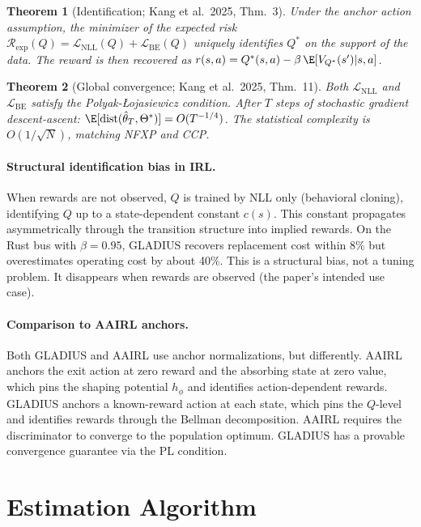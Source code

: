 \documentclass[11pt]{article}
\newtheorem{theorem}{Theorem}
\begin{document}
\begin{theorem}[Identification; Kang et al.\ 2025, Thm.\ 3]
Under the anchor action assumption, the minimizer of the expected risk $\mathcal{R}_{\text{exp}}(Q) = \mathcal{L}_{\text{NLL}}(Q) + \mathcal{L}_{\text{BE}}(Q)$ uniquely identifies $Q^*$ on the support of the data. The reward is then recovered as $r(s,a) = Q^*(s,a) - \beta\,\E[V_{Q^*}(s')|s,a]$.
\end{theorem}

\begin{theorem}[Global convergence; Kang et al.\ 2025, Thm.\ 11]
Both $\mathcal{L}_{\text{NLL}}$ and $\mathcal{L}_{\text{BE}}$ satisfy the Polyak-\L{}ojasiewicz condition. After $T$ steps of stochastic gradient descent-ascent: $\E[\text{dist}(\hat{\theta}_T, \Theta^*)] = O(T^{-1/4})$. The statistical complexity is $O(1/\sqrt{N})$, matching NFXP and CCP.
\end{theorem}

\paragraph{Structural identification bias in IRL.} When rewards are not observed, $Q$ is trained by NLL only (behavioral cloning), identifying $Q$ up to a state-dependent constant $c(s)$. This constant propagates asymmetrically through the transition structure into implied rewards. On the Rust bus with $\beta = 0.95$, GLADIUS recovers replacement cost within 8\% but overestimates operating cost by about 40\%. This is a structural bias, not a tuning problem. It disappears when rewards are observed (the paper's intended use case).

\paragraph{Comparison to AAIRL anchors.} Both GLADIUS and AAIRL use anchor normalizations, but differently. AAIRL anchors the exit action at zero reward and the absorbing state at zero value, which pins the shaping potential $h_\phi$ and identifies action-dependent rewards. GLADIUS anchors a known-reward action at each state, which pins the $Q$-level and identifies rewards through the Bellman decomposition. AAIRL requires the discriminator to converge to the population optimum. GLADIUS has a provable convergence guarantee via the PL condition.


\section{Estimation Algorithm}
\end{document}
